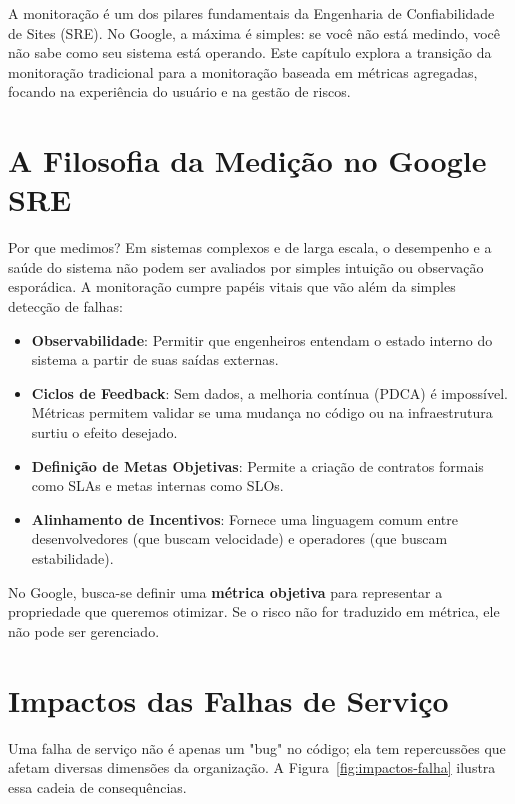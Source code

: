 \documentclass[12pt,a4paper,twoside]{report}
\begin{document}
A monitoração é um dos pilares fundamentais da Engenharia de Confiabilidade de Sites (SRE). No Google, a máxima é simples: se você não está medindo, você não sabe como seu sistema está operando. Este capítulo explora a transição da monitoração tradicional para a monitoração baseada em métricas agregadas, focando na experiência do usuário e na gestão de riscos.

\section{A Filosofia da Medição no Google SRE}

Por que medimos? Em sistemas complexos e de larga escala, o desempenho e a saúde do sistema não podem ser avaliados por simples intuição ou observação esporádica. A monitoração cumpre papéis vitais que vão além da simples detecção de falhas:

\begin{itemize}
    \item \textbf{Observabilidade}: Permitir que engenheiros entendam o estado interno do sistema a partir de suas saídas externas.
    \item \textbf{Ciclos de Feedback}: Sem dados, a melhoria contínua (PDCA) é impossível. Métricas permitem validar se uma mudança no código ou na infraestrutura surtiu o efeito desejado.
    \item \textbf{Definição de Metas Objetivas}: Permite a criação de contratos formais como SLAs e metas internas como SLOs.
    \item \textbf{Alinhamento de Incentivos}: Fornece uma linguagem comum entre desenvolvedores (que buscam velocidade) e operadores (que buscam estabilidade).
\end{itemize}

No Google, busca-se definir uma \textbf{métrica objetiva} para representar a propriedade que queremos otimizar. Se o risco não for traduzido em métrica, ele não pode ser gerenciado.

\section{Impactos das Falhas de Serviço}

Uma falha de serviço não é apenas um "bug" no código; ela tem repercussões que afetam diversas dimensões da organização. A Figura~\ref{fig:impactos-falha} ilustra essa cadeia de consequências.
\end{document}
